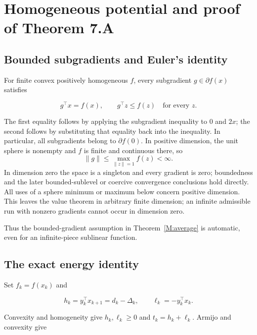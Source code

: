 \section{Homogeneous potential and proof of Theorem
7.A}\label{H:homogeneous-potential-and-proof-of-theorem-a}



\subsection{Bounded subgradients and Euler's
identity}\label{H:bounded-subgradients-and-eulers-identity}

For finite convex positively homogeneous \(f\), every subgradient
\(g\in\partial f(x)\) satisfies

\[
g^\top x=f(x),\qquad g^\top z\le f(z)\quad\text{for every }z.
\]

The first equality follows by applying the subgradient inequality to
\(0\) and \(2x\); the second follows by substituting that equality back
into the inequality. In particular, all subgradients belong to
\(\partial f(0)\). In positive dimension, the unit sphere is nonempty and \(f\) is finite and continuous there, so
\[
\|g\|\le\max_{\|z\|=1}f(z)<\infty.
\]
In dimension zero the space is a singleton and every gradient is zero; boundedness and the later bounded-sublevel or coercive convergence conclusions hold directly. All uses of a sphere minimum or maximum below concern positive dimension. This leaves the value theorem in arbitrary finite dimension; an infinite admissible run with nonzero gradients cannot occur in dimension zero.

Thus the bounded-gradient assumption in Theorem~\ref{M:average} is automatic, even for
an infinite-piece sublinear function.



\subsection{The exact energy
identity}\label{H:the-exact-energy-identity}

Set \(f_k=f(x_k)\) and

\[
h_k=y_k^\top x_{k+1}=d_k-\Delta_k,\qquad
\ell_k=-y_k^\top x_k.
\]

Convexity and homogeneity give \(h_k,\ell_k\ge0\) and
\(t_k=h_k+\ell_k\). Armijo and convexity give

